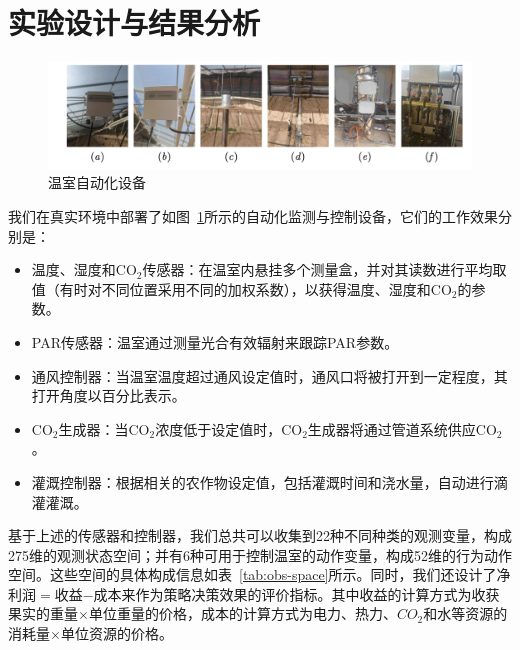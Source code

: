 \section{实验设计与结果分析}

\begin{figure}
\centering
\includegraphics[width=\textwidth]{figures/devices.png}
\caption{温室自动化设备}
\label{fig:devices}
\end{figure}

我们在真实环境中部署了如图~\ref{fig:devices}所示的自动化监测与控制设备，它们的工作效果分别是：

\begin{itemize}
    \item 温度、湿度和CO$_2$传感器：在温室内悬挂多个测量盒，并对其读数进行平均取值（有时对不同位置采用不同的加权系数），以获得温度、湿度和CO$_2$的参数。
    \item PAR传感器：温室通过测量光合有效辐射来跟踪PAR参数。
    \item 通风控制器：当温室温度超过通风设定值时，通风口将被打开到一定程度，其打开角度以百分比表示。
    \item CO$_2$生成器：当CO$_2$浓度低于设定值时，CO$_2$生成器将通过管道系统供应CO$_2$。
    \item 灌溉控制器：根据相关的农作物设定值，包括灌溉时间和浇水量，自动进行滴灌灌溉。
\end{itemize}

基于上述的传感器和控制器，我们总共可以收集到22种不同种类的观测变量，构成275维的观测状态空间；并有6种可用于控制温室的动作变量，构成52维的行为动作空间。这些空间的具体构成信息如表~\ref{tab:obs-space}所示。同时，我们还设计了净利润$=$收益$-$成本来作为策略决策效果的评价指标。其中收益的计算方式为收获果实的重量$\times$单位重量的价格，成本的计算方式为电力、热力、$CO_2$和水等资源的消耗量$\times$单位资源的价格。

